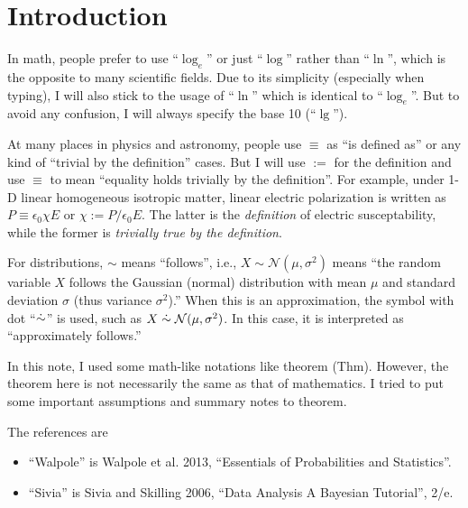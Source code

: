 \chapter*{Introduction}

In math, people prefer to use ``$ \log_e $'' or just ``$ \log $'' rather than ``$ \ln $'', which is the opposite to many scientific fields. Due to its simplicity (especially when typing), I will also stick to the usage of ``$ \ln $'' which is identical to ``$ \log_e $''. But to avoid any confusion, I will always specify the base 10 (``$ \lg $'').

At many places in physics and astronomy, people use $ \equiv $ as ``is defined as'' or any kind of ``trivial by the definition'' cases. But I will use $ := $ for the definition and use $ \equiv $ to mean ``equality holds trivially by the definition''. For example, under 1-D linear homogeneous isotropic matter, linear electric polarization is written as $ P \equiv \epsilon_0 \chi E $ or $ \chi := P/\epsilon_0 E $. The latter is the \textit{definition} of electric susceptability, while the former is \textit{trivially true by the definition}. 

For distributions, $ \sim $ means ``follows'', i.e., $ X \sim \mathcal{N}(\mu, \sigma^2) $ means ``the random variable $ X $ follows the Gaussian (normal) distribution with mean $ \mu $ and standard deviation $ \sigma $ (thus variance $ \sigma^2 $).'' When this is an approximation, the symbol with dot ``$ \mathrel{\dot{\sim}} $'' is used, such as $ X \mathrel{\dot{\sim}} \mathcal{N}(\mu, \sigma^2) $. In this case, it is interpreted as ``approximately follows.''

In this note, I used some math-like notations like theorem (Thm). However, the theorem here is not necessarily the same as that of mathematics. I tried to put some important assumptions and summary notes to theorem.

The references are 
\begin{itemize}
\item ``Walpole'' is Walpole et al. 2013, ``Essentials of Probabilities and Statistics''.
\item ``Sivia'' is Sivia and Skilling 2006, ``Data Analysis A Bayesian Tutorial'', 2/e.
\end{itemize}